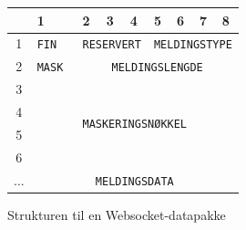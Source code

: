 \documentclass{article}
\newlength{\bcw}
\begin{document}
\begin{figure}[h]
    \centering
    \begin{tabular}[h]{c|m{\bcw}|m{\bcw}|m{\bcw}|m{\bcw}|m{\bcw}|m{\bcw}|m{\bcw}|m{\bcw}|}
        & 1 & 2 & 3 & 4 & 5 & 6 & 7 & 8 \\
        \hline
        1 & \tt{FIN} & \multicolumn{3}{c|}{\tt{RESERVERT}} & \multicolumn{4}{c|}{\tt{MELDINGSTYPE}} \\
        \hline
        2 & \tt{MASK} & \multicolumn{7}{c|}{\tt{MELDINGSLENGDE}} \\
        \hline
        3 & \multicolumn{8}{c|}{\multirow{4}{*}{\tt{MASKERINGSNØKKEL}}} \\
        4 & \multicolumn{8}{c|}{\multirow{4}{*}{}} \\
        5 & \multicolumn{8}{c|}{\multirow{4}{*}{}} \\
        6 & \multicolumn{8}{c|}{\multirow{4}{*}{}} \\
        \hline 
        ... & \multicolumn{8}{c|}{\tt{MELDINGSDATA}} \\
        \hline
    \end{tabular}
    \caption{Strukturen til en Websocket-datapakke}
\end{figure}
\end{document}
